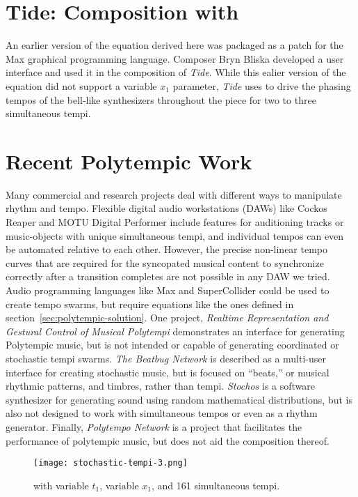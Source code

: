 \section{Tide: Composition with \polytempic}
\label{sec:composition}
An earlier version of the equation derived here was packaged as a
patch for the Max
graphical programming language. Composer Bryn Bliska developed a user
interface and used it in the composition of
\textit{Tide}.
While this ealier version of the equation did not support a variable
$x_1$ parameter, \textit{Tide} uses \polytempic to drive the phasing
tempos of the bell-like synthesizers throughout the piece for two to
three simultaneous tempi.

\section{Recent Polytempic Work}
\label{sec:polytempic-prior-work}
Many commercial and research projects deal with different ways to
manipulate rhythm and tempo. Flexible digital audio workstations
(DAWs) like Cockos Reaper and
MOTU Digital
Performer
include features for auditioning tracks or music-objects with unique
simultaneous tempi, and individual tempos can even be automated
relative to each other. However, the precise non-linear tempo curves
that are required for the syncopated musical content to synchronize
correctly after a transition completes are not possible in any DAW we
tried. Audio programming languages like Max and
SuperCollider could be used
to create tempo swarms, but require equations like the ones defined in
section~\ref{sec:polytempic-solution}. One project, \textit{Realtime
  Representation and Gestural Control of Musical
  Polytempi}\cite{Nash2008} demonstrates an interface for generating
Polytempic music, but is not intended or capable of generating
coordinated or stochastic tempi swarms.  \textit{The Beatbug
  Network}\cite{Weinberg2002} is described as a multi-user interface
for creating stochastic music, but is focused on ``beats,'' or musical
rhythmic patterns, and timbres, rather than
tempi. \textit{Stochos}\cite{Bokesoy2003} is a software synthesizer
for generating sound using random mathematical distributions, but is
also not designed to work with simultaneous tempos or even as a rhythm
generator. Finally, \textit{Polytempo Network}\cite{Kocher2014} is a
project that facilitates the performance of polytempic music, but does
not aid the composition thereof.

\begin{figure*}[]
  \texttt{[image: stochastic-tempi-3.png]}
  \caption{\polytempic with variable $t_1$, variable $x_1$, and 161
    simultaneous tempi.}
  \label{fig:polytempic-transition-3}
\end{figure*}


